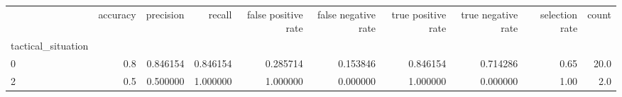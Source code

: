 \begin{tabular}{lrrrrrrrrr}
\toprule
{} &  accuracy &  precision &    recall &  false positive rate &  false negative rate &  true positive rate &  true negative rate &  selection rate &  count \\
tactical\_situation &           &            &           &                      &                      &                     &                     &                 &        \\
\midrule
0                  &       0.8 &   0.846154 &  0.846154 &             0.285714 &             0.153846 &            0.846154 &            0.714286 &            0.65 &   20.0 \\
2                  &       0.5 &   0.500000 &  1.000000 &             1.000000 &             0.000000 &            1.000000 &            0.000000 &            1.00 &    2.0 \\
\bottomrule
\end{tabular}
